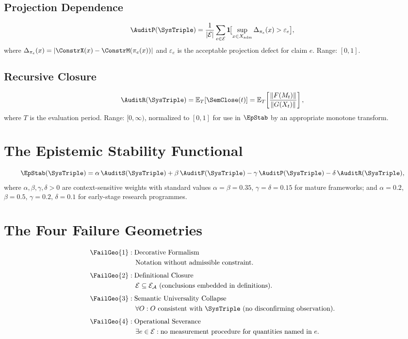 \subsection{Projection Dependence}
\[
  \AuditP(\SysTriple)
  = \frac{1}{|\mathcal{E}|} \sum_{e \in \mathcal{E}}
  \mathbf{1}\!\bigl[\sup_{x \in X_{\mathrm{adm}}}
  \Delta_{\pi_e}(x) > \varepsilon_e\bigr],
\]
where $\Delta_{\pi_e}(x) = |\ConstrX(x) - \ConstrM(\pi_e(x))|$
and $\varepsilon_e$ is the acceptable projection defect
for claim $e$. Range: $[0,1]$.

\subsection{Recursive Closure}
\[
  \AuditR(\SysTriple)
  = \mathbb{E}_T\!\left[\SemClose(t)\right]
  = \mathbb{E}_T\!\left[\frac{\|F(M_t)\|}{\|G(X_t)\|}\right],
\]
where $T$ is the evaluation period. Range: $[0, \infty)$,
normalized to $[0,1]$ for use in $\EpStab$ by an appropriate
monotone transform.

\section{The Epistemic Stability Functional}
\label{app-g:stability}

\[
  \EpStab(\SysTriple)
  = \alpha\,\AuditS(\SysTriple)
  + \beta\,\AuditF(\SysTriple)
  - \gamma\,\AuditP(\SysTriple)
  - \delta\,\AuditR(\SysTriple),
\]
where $\alpha, \beta, \gamma, \delta > 0$ are
context-sensitive weights with standard values
$\alpha = \beta = 0.35$, $\gamma = \delta = 0.15$
for mature frameworks; and $\alpha = 0.2$,
$\beta = 0.5$, $\gamma = 0.2$, $\delta = 0.1$
for early-stage research programmes.

\section{The Four Failure Geometries}
\label{app-g:failures}

\begin{align*}
  \FailGeo{1} &: \text{Decorative Formalism}\\
  &\quad \text{Notation without admissible constraint.}\\[4pt]
  \FailGeo{2} &: \text{Definitional Closure}\\
  &\quad \mathcal{E} \subseteq \mathcal{E}_{\mathcal{A}}
  \text{ (conclusions embedded in definitions).}\\[4pt]
  \FailGeo{3} &: \text{Semantic Universality Collapse}\\
  &\quad \forall O: O \text{ consistent with }
  \SysTriple \text{ (no disconfirming observation).}\\[4pt]
  \FailGeo{4} &: \text{Operational Severance}\\
  &\quad \exists e \in \mathcal{E}: \text{no measurement}
  \text{ procedure for quantities named in } e.
\end{align*}

